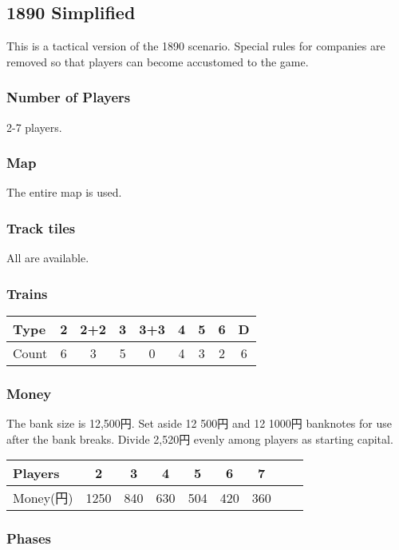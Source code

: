 \begin{multicols}{2}
\newpage

\subsection{1890 Simplified}

This is a tactical version of the 1890 scenario. Special rules for
companies are removed so that players can become accustomed to the
game.

\subsubsection{Number of Players}
2-7 players.

\subsubsection{Map}
The entire map is used.

\subsubsection{Track tiles}
All are available.

\subsubsection{Trains}

\begin{tabular}{l|cccccccc}
Type & 2 & 2+2 & 3 & 3+3 & 4 & 5 & 6 & D \\ \hline
Count & 6 & 3 & 5 & 0 & 4 & 3 & 2 & 6
\end{tabular}

\subsubsection{Money}
The bank size is 12,500円. Set aside 12 500円 and 12 1000円
banknotes for use after the bank breaks. Divide 2,520円 evenly
among players as starting capital.

\begin{tabular}{l|cccccccc}
Players & 2 & 3 & 4 & 5 & 6 & 7 \\ \hline
Money(円) & 1250 & 840 & 630 & 504 & 420 & 360
\end{tabular}

\subsubsection{Phases}


\end{multicols}
